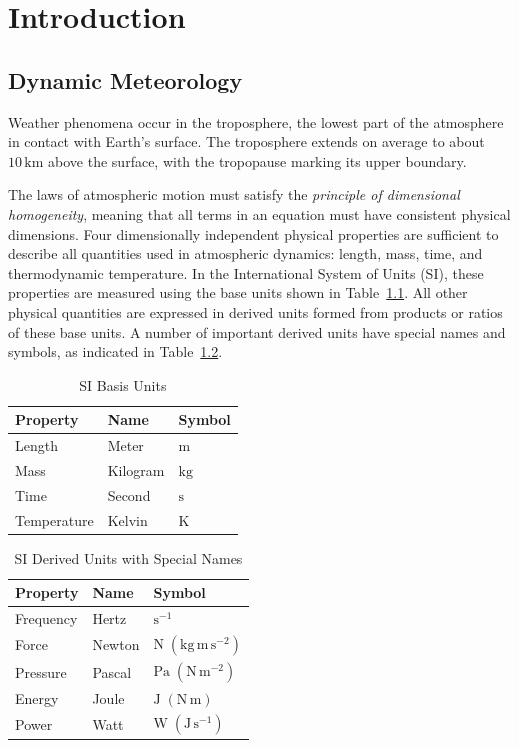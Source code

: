 \documentclass[10pt,twocolumn]{memoir}
\begin{document}
\chapter{Introduction}
\label{ch:introduction}

\section{Dynamic Meteorology}

Weather phenomena occur in the troposphere, the lowest part of the atmosphere in contact with Earth's surface. The troposphere extends on average to about $10\,\mathrm{km}$ above the surface, with the tropopause marking its upper boundary.

The laws of atmospheric motion must satisfy the \textit{principle of dimensional homogeneity}, meaning that all terms in an equation must have consistent physical dimensions. Four dimensionally independent physical properties are sufficient to describe all quantities used in atmospheric dynamics: length, mass, time, and thermodynamic temperature. In the International System of Units (SI), these properties are measured using the base units shown in Table~\ref{tab:c1_base_units}. All other physical quantities are expressed in derived units formed from products or ratios of these base units. A number of important derived units have special names and symbols, as indicated in Table~\ref{tab:c1_derived_units}.

\begin{table}[h]
\centering
\caption{SI Basis Units}
\begin{tabular}{lll}
\hline
Property & Name & Symbol \\
\hline
Length      & Meter    & $\mathrm{m}$  \\
Mass        & Kilogram & $\mathrm{kg}$ \\
Time        & Second   & $\mathrm{s}$  \\
Temperature & Kelvin   & $\mathrm{K}$  \\
\hline
\end{tabular}
\label{tab:c1_base_units}
\end{table}

\begin{table}[h]
\centering
\caption{SI Derived Units with Special Names}
\begin{tabular}{lll}
\hline
Property & Name & Symbol \\
\hline
Frequency & Hertz  & $\mathrm{s^{-1}}$ \\
Force     & Newton & $\mathrm{N}\;(\mathrm{kg\,m\,s^{-2}})$ \\
Pressure  & Pascal & $\mathrm{Pa}\;(\mathrm{N\,m^{-2}})$ \\
Energy    & Joule  & $\mathrm{J}\;(\mathrm{N\,m})$ \\
Power     & Watt   & $\mathrm{W}\;(\mathrm{J\,s^{-1}})$ \\
\hline
\end{tabular}
\label{tab:c1_derived_units}
\end{table}
\end{document}
